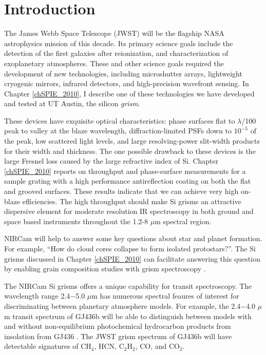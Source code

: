 \chapter{Introduction}


The James Webb Space Telescope (JWST) will be the flagship NASA astrophysics mission of this decade.  Its primary science goals include the detection of the first galaxies after reionization, and characterization of exoplanetary atmospheres.  These and other science goals required the development of new technologies, including microshutter arrays, lightweight cryogenic mirrors, infrared detectors, and high-precision wavefront sensing.  In Chapter \ref{chSPIE_2010}, I describe one of these technologies we have developed and tested at UT Austin, the silicon \emph{grism}.

These devices have exquisite optical characteristics: phase surfaces flat to $\lambda$/100 peak to valley at the blaze wavelength, diffraction-limited PSFs down to $10^{-5}$ of the peak, low scattered light levels, and large resolving-power slit-width products for their width and thickness.  The one possible drawback to these devices is the large Fresnel loss caused by the large refractive index of Si.  Chapter \ref{chSPIE_2010} reports on throughput and phase-surface measurements for a sample grating with a high performance antireflection coating on both the flat and grooved surfaces. These results indicate that we can achieve very high on-blaze efficiencies.  The high throughput should make Si grisms an attractive dispersive element for moderate resolution IR spectroscopy in both ground and space based instruments throughout the 1.2-8 $\mu$m spectral region.

NIRCam will help to answer some key questions about star and planet formation.  For example, ``How do cloud cores collapse to form isolated protostars?''.  The Si grisms discussed in Chapter \ref{chSPIE_2010} can facilitate answering this question by enabling grain composition studies with grism spectroscopy \citep{2012SPIE.8442E..2NB}.

The NIRCam Si grisms offers a unique capability for transit spectroscopy.  The wavelength range 2.4$-$5.0 $\mu$m has numerous spectral feaures of interest for discriminating between planetary atmosphere models.  For example, the 2.4$-$4.0 $\mu$m transit spectrum of GJ436b will be able to distinguish between models with and without non-equilibrium photochemical hydrocarbon products from insolation from GJ436 \citep{2011ApJ...727...65S}.  The JWST grism spectrum of GJ436b will have detectable signatures of CH$_4$, HCN, C$_2$H$_2$, CO, and CO$_2$.

